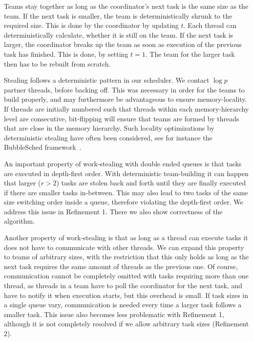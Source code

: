 \documentclass[preprint]{sigplanconf}
\begin{document}
Teams stay together as long as the coordinator's next task is
the same size as the team. If the next task is smaller, the team is
deterministically shrunk to the required size. This is done by the
coordinator by updating $t$. Each thread can deterministically
calculate, whether it is still on the team. If the next task is
larger, the coordinator breaks up the team as soon as execution of the
previous task has finished. This is done, by setting $t=1$. The team
for the larger task then has to be rebuilt from scratch.

Stealing follows a deterministic pattern in our scheduler. We contact
$\log p$ partner threads, before backing off. This was necessary in
order for the teams to build properly, and may furthermore be advantageous
to ensure memory-locality.  If threads are initially numbered such that
threads within each  memory-hierarchy level are consecutive,
bit-flipping will ensure that teams are formed by threads that are
close in the memory hierarchy.  Such locality optimizations by
deterministic stealing have often been considered, see for instance
the BubbleSched framework~\cite{Thibault07}. 

An important property of work-stealing with double ended queues is
that tasks are executed in depth-first order. With deterministic
team-building it can happen that larger ($r>2$) tasks are
stolen back and forth until they are finally executed if there are smaller tasks in-between. This may also
lead to two tasks of the same size switching order inside a queue,
therefore violating the depth-first order. We address this issue in
Refinement 1. There we also show correctness of the algorithm. 

Another property of work-stealing is that as long as a thread can
execute tasks it does not have to communicate with other threads. We
can expand this property to teams of arbitrary sizes, with the
restriction that this only holds as long as the next task requires the
same amount of threads as the previous one. Of course, communication
cannot be completely omitted with tasks requiring more than one
thread, as threads in a team have to poll the coordinator for the next
task, and have to notify it when execution starts, but this overhead
is small.  If task sizes in a single queue vary, communication is
needed every time a larger task follows a smaller task. This issue
also becomes less problematic with Refinement 1, although it is not
completely resolved if we allow arbitrary task sizes (Refinement 2).
\end{document}
